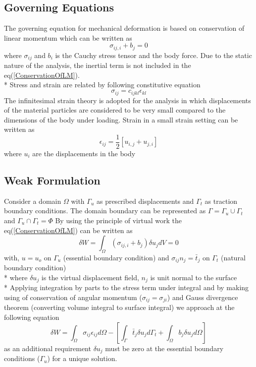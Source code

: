 \documentclass[11pt]{article}
\begin{document}
\subsection{Governing Equations}
The governing equation for mechanical deformation is based on conservation of
linear momentum which can be written as \cite{Dr.Huetter2019}
\begin{equation}\label{ConservationOfLM}
\sigma_{ij,i} + b_j = 0
\end{equation}
where $ \sigma_{ij} $ and $ b_i $ is the Cauchy stress tensor and the body force.
Due to the static nature of the analysis, the inertial term is not included in
the eq(\ref{ConservationOfLM}).\\*
Stress and strain are related by following constitutive equation
\begin{equation}
\sigma_{ij} = c_{ijkl} \epsilon_{kl}
\end{equation}
The infinitesimal strain theory is adopted for the analysis in which
displacements of the material particles are considered to be very small compared
to the dimensions of the body under loading. Strain in a small strain setting
can be written as
\begin{equation}
\epsilon_{ij}=\frac{1}{2}[u_{i,j}+u_{j,i}]
\end{equation}
where $ u_{i} $ are the displacements in the body


\subsection{Weak Formulation}
Consider a domain $\Omega$ with $\Gamma_u$ as prescribed displacements and
$\Gamma_t$ as traction boundary conditions. The domain boundary can be
represented as $\Gamma = \Gamma_u \cup \Gamma_t$ and $\Gamma_u \cap \Gamma_t =
\Phi$
By using the principle of virtual work the eq(\ref{ConservationOfLM}) can be written as
\begin{equation}
\delta W = \int_\Omega (\sigma_{ij,i} + b_j ) \delta u_j dV = 0
\end{equation} 
with,
$u = u_o$ on $\Gamma_u$ (essential boundary condition) and
$\sigma_{ij}n_j = \bar{t}_j$ on $\Gamma_t$ (natural boundary condition) \\*
where $\delta u_j$ is the virtual displacement field, $n_j$ is unit normal to
the surface \\*
Applying integration by parts to the stress term under integral and by making
using of conservation of angular momentum ($ \sigma_{ij} = \sigma_{ji} $) and
Gauss divergence theorem (converting volume integral to surface integral) we
approach at the following equation
\begin{equation} \label{FinalWeakform}
\delta W = \int_{\Omega} \sigma_{ij} \epsilon_{ij} d\Omega - \left[
\int_{\Gamma} \bar{t}_j \delta u_j d\Gamma_t  + \int_{\Omega} b_j \delta u_j
d\Omega \right]
\end{equation}
as an additional requirement $\delta u_j$ must be zero at the essential boundary
conditions ($\Gamma_u$) for a unique solution.
\end{document}
